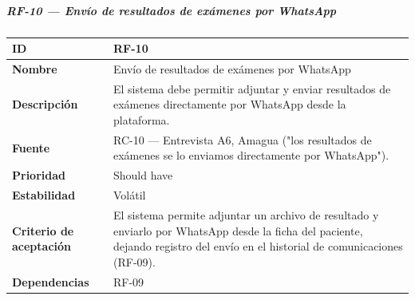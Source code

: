 \subparagraph{RF-10 --- Envío de resultados de exámenes por
WhatsApp}\label{rf-10-envuxedo-de-resultados-de-exuxe1menes-por-whatsapp}

{\def\LTcaptype{none} %
\begin{longtable}[]{@{}
  >{\raggedright\arraybackslash}p{}
  >{\raggedright\arraybackslash}p{}@{}}
\toprule\noalign{}
\begin{minipage}[b]{\linewidth}\raggedright
\textbf{ID}
\end{minipage} & \begin{minipage}[b]{\linewidth}\raggedright
RF-10
\end{minipage} \\
\midrule\noalign{}
\endhead
\bottomrule\noalign{}
\endlastfoot
\textbf{Nombre} & \begin{minipage}[t]{\linewidth}\raggedright
Envío de resultados de exámenes por WhatsApp
\end{minipage} \\
\textbf{Descripción} & \begin{minipage}[t]{\linewidth}\raggedright
El sistema debe permitir adjuntar y enviar resultados de exámenes
directamente por WhatsApp desde la plataforma.
\end{minipage} \\
\textbf{Fuente} & \begin{minipage}[t]{\linewidth}\raggedright
RC-10 --- Entrevista A6, Amagua ("los resultados de exámenes se lo
enviamos directamente por WhatsApp").
\end{minipage} \\
\textbf{Prioridad} & \begin{minipage}[t]{\linewidth}\raggedright
Should have
\end{minipage} \\
\textbf{Estabilidad} & \begin{minipage}[t]{\linewidth}\raggedright
Volátil
\end{minipage} \\
\textbf{Criterio de aceptación} &
\begin{minipage}[t]{\linewidth}\raggedright
El sistema permite adjuntar un archivo de resultado y enviarlo por
WhatsApp desde la ficha del paciente, dejando registro del envío en el
historial de comunicaciones (RF-09).
\end{minipage} \\
\textbf{Dependencias} & \begin{minipage}[t]{\linewidth}\raggedright
RF-09
\end{minipage} \\
\end{longtable}
}

